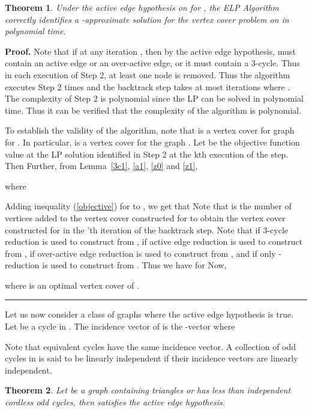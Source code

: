 \documentclass[12pt]{article}
\newtheorem{theorem}{Theorem}
\newenvironment{proof}[1][Proof]{\textbf{#1.} }{\ \rule{0.5em}{0.5em}}
\begin{document}
\vskip 5pt
\begin{theorem}
\label{conclusion} Under the active edge hypothesis on  for , the ELP
Algorithm correctly identifies a -approximate solution
 for the vertex cover problem on  in polynomial time.
\end{theorem}
\begin{proof} Note that if  at any iteration , then by the active edge hypothesis, 
must contain an active edge or an over-active edge, or it must contain a 3-cycle. Thus in
each execution of Step 2, at least one node is removed. Thus the
algorithm executes Step 2  times and the backtrack step takes
at most  iterations where . The complexity of Step 2 is
polynomial since the LP can be solved in polynomial time. Thus it
can be verified that
the complexity of the algorithm is polynomial.

\vskip 5pt

To establish the validity of the algorithm, note that  is a
vertex cover for graph  for . In particular,
 is a vertex cover for the graph . Let  be the
objective function value at the LP solution identified in Step 2 at
the kth execution of the step. Then 
Further, from Lemma~\ref{3c1}, \ref{a1}, \ref{z0} and \ref{z1},

where

Adding inequality (\ref{objective}) for   to , we get that
 Note that  is
the number of vertices added to the  vertex cover constructed for
 to obtain the vertex cover constructed for  in the
'th iteration of the backtrack step. Note that  if 3-cycle reduction is used to construct
 from ,  if active
 edge reduction is used to construct  from ,  if over-active
 edge reduction is used to construct  from , and 
 if only -reduction is used to construct  from . Thus we
have  for  Now,

where  is an optimal vertex cover of .\end{proof}

\vskip 10pt

Let us now consider a class of graphs where the active
edge hypothesis is true. Let  be a cycle in . The incidence vector of  is the
-vector  
where

\noindent Note that equivalent cycles have the same incidence
vector. A collection  of odd cycles
in  is said to be linearly independent if their incidence
vectors are linearly independent.



\begin{theorem}Let  be a graph containing triangles or has less than  independent
cordless odd cycles, then  satisfies the active edge
hypothesis.\end{theorem}
\end{document}
